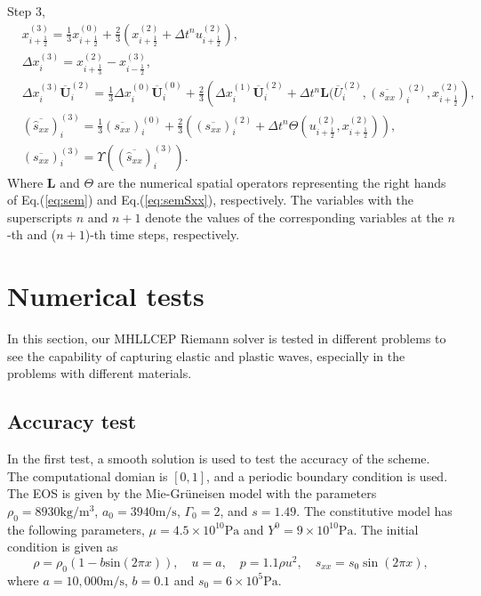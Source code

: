 \documentclass[review]{elsarticle}
\begin{document}
Step 3,
\begin{equation}
  \begin{aligned}
    & x_{i+\frac{1}{2}}^{(3)} = \frac{1}{3} x_{i+\frac{1}{2}}^{(0)}+\frac{2}{3} \left( x_{i+\frac{1}{2}}^{(2)}+\Delta t^n u_{i+\frac{1}{2}}^{(2)}\right),\\
    & \Delta x_i^{(3)} =  x_{i+\frac{1}{3}}^{(2)}- x_{i-\frac{1}{2}}^{(3)},\\
    & \Delta x_i^{(3)} \overline{\mathbf{U}}_i^{(2)}  = \frac{1}{3} \Delta x_i^{(0)} \overline{\mathbf{U}}_i^{(0)}+ \frac{2}{3} \left(  \Delta x_i^{(1)} \overline{\mathbf{U}}_i^{(2)} + \Delta t^n \mathbf{L}(\overline{U}_i^{(2)}, (\overline{s_{xx}})_i^{(2)}, x_{i+\frac{1}{2}}^{(2)} \right),\\
    & (\overline{\hat{s}_{xx}})_i^{(3)} =\frac{1}{3} (\overline{s_{xx}})_i^{(0)} + \frac{2}{3} \left(  (\overline{s_{xx}})_i^{(2)}+\Delta t^ n \varTheta (u_{i+\frac{1}{2}}^{(2)}, x_{i+\frac{1}{2}}^{(2)})\right),\\
  & (\overline{s_{xx}})_i^{(3)} = \Upsilon((\overline{\hat{s}_{xx}})_i^{(3)}).
\end{aligned}
\end{equation}
Where $\mathbf{L}$ and $\varTheta$ are the numerical spatial operators representing the right hands of Eq.(\ref{eq:sem}) and Eq.(\ref{eq:semSxx}), respectively. The variables with the superscripts $n$ and $n+1$ denote the values of the corresponding variables at the $n$-th and ($n+1$)-th time steps, respectively.

\section{Numerical tests}
In this section, our MHLLCEP Riemann solver is tested  in different problems to see the capability of  capturing elastic and plastic waves, especially in the problems  with different materials.

\subsection{Accuracy test}
In the first test, a smooth solution is used to test the accuracy of the scheme. The computational domian is $[0,1]$, and a periodic boundary condition is used. The EOS is given by the Mie-Gr\"uneisen model with the parameters $\rho_0 = 8930 \text{kg}/\text{m}^3$, $a_0 = 3940 \text{m}/\text{s}$, $\Gamma_0 =2$, and $s=1.49$. The constitutive model has the following parameters, $\mu = 4.5\times 10^{10} \text{Pa}$ and $Y^0 = 9\times 10^{10} \text{Pa}$.  The initial condition  is  given as
\begin{equation}
  \rho = \rho_0(1-b \text{sin}(2\pi x)), \quad u = a, \quad p = 1.1\rho u^2, \quad  s_{xx} = s_0 \sin(2\pi x),
\end{equation}
where $a = 10,000\text{m}/\text{s}$, $ b = 0.1$  and  $s_0 = 6\times 10^5 \text{Pa}$.
\end{document}
